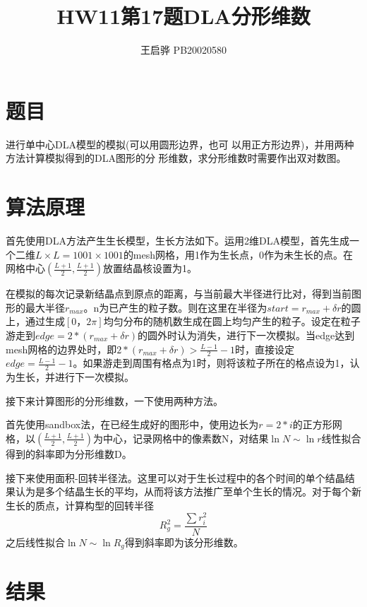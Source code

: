 \documentclass{article}
\title{\songti \zihao{2}\bfseries HW11第17题DLA分形维数}
\author{王启骅 PB20020580}
\begin{document}
	\maketitle
	\section{题目}
进行单中心DLA模型的模拟(可以用圆形边界，也可
以用正方形边界)，并用两种方法计算模拟得到的DLA图形的分
形维数，求分形维数时需要作出双对数图。
	\section{算法原理}
	首先使用DLA方法产生生长模型，生长方法如下。运用2维DLA模型，首先生成一个二维$ L\times L=1001\times1001 $的mesh网格，用1作为生长点，0作为未生长的点。在网格中心$ (\frac{L+1}{2},\frac{L+1}{2}) $放置结晶核设置为1。
	
	
	在模拟的每次记录新结晶点到原点的距离，与当前最大半径进行比对，得到当前图形的最大半径$ r_{max} $。n为已产生的粒子数。则在这里在半径为$ start=r_{max}+\delta r $的圆上，通过生成$ [0，2\pi] $均匀分布的随机数生成在圆上均匀产生的粒子。设定在粒子游走到$ edge=2*(r_{max}+\delta r) $的圆外时认为消失，进行下一次模拟。当edge达到mesh网格的边界处时，即$2*(r_{max}+\delta r)>\frac{L-1}{2}-1 $时，直接设定$ edge=\frac{L-1}{2}-1 $。如果游走到周围有格点为1时，则将该粒子所在的格点设为1，认为生长，并进行下一次模拟。
	
	
	接下来计算图形的分形维数，一下使用两种方法。
	
	
	首先使用sandbox法，在已经生成好的图形中，使用边长为$ r=2*i $的正方形网格，以$ (\frac{L+1}{2},\frac{L+1}{2}) $为中心，记录网格中的像素数N，对结果$ \ln N\sim \ln r $线性拟合得到的斜率即为分形维数D。
	
	
	接下来使用面积-回转半径法。这里可以对于生长过程中的各个时间的单个结晶结果认为是多个结晶生长的平均，从而将该方法推广至单个生长的情况。对于每个新生长的质点，计算构型的回转半径
	\begin{equation}
		R_g^2=\frac{\sum r_i^2}{N}
	\end{equation}
	之后线性拟合$ \ln N\sim \ln R_g $得到斜率即为该分形维数。
	
	\section{结果}
\end{document}
